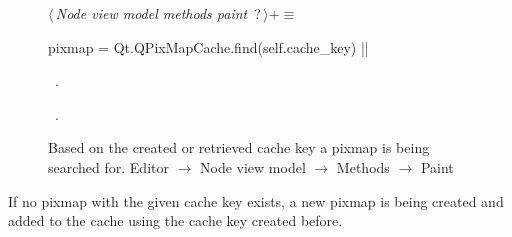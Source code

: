 \documentclass[%
    a4paper,    %
    justified,  %
    nobib,      %
    openany     %
]{tufte-book}
\begin{document}
\begin{figure}
\begin{flushleft} \small
\begin{minipage}{\linewidth}\label{scrap79}\raggedright\small
{} $\langle\,${\itshape Node view model methods paint}\nobreak\ {\footnotesize {?}}$\,\rangle+\equiv$
\vspace{-1ex}
\begin{pythoncode}
    pixmap = Qt.QPixMapCache.find(self.cache_key)
|\NWsep|
\end{pythoncode}
\vspace{1.5ex}
\footnotesize
\begin{list}{}{\setlength{\itemsep}{-\parsep}\setlength{\itemindent}{-\leftmargin}}
\item \NWtxtMacroDefBy\ .
\item \NWtxtMacroRefIn\ .

\item{}
\end{list}
\end{minipage}\vspace{4ex}
\end{flushleft}
\caption{Based on the created or retrieved cache key a pixmap is being searched
  for.
  \newline{}\newline{}Editor $\rightarrow$ Node view model $\rightarrow$
  Methods $\rightarrow$ Paint}
\label{editor:lst:node-view-model:methods:paint:find-pixmap}
\end{figure}

If no pixmap with the given cache key exists, a new pixmap is being created and
added to the cache using the cache key created before.
\end{document}
